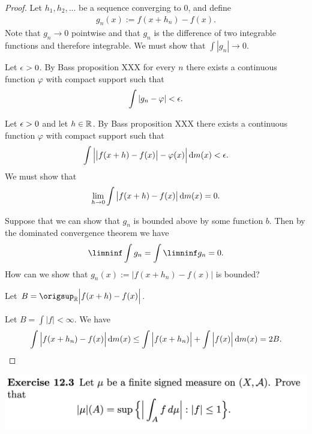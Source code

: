\begin{proof}
  Let $h_1, h_2, ...$ be a sequence converging to $0$, and define
  \begin{align*}
    g_n(x) := f(x + h_n) - f(x).
  \end{align*}
  Note that $g_n \to 0$ pointwise and that $g_n$ is the difference of two integrable functions and therefore
  integrable. We must show that $\int |g_n| \to 0$.

  Let $\epsilon > 0$. By Bass proposition XXX for every $n$ there exists a continuous function $\varphi$ with
  compact support such that
  \begin{align*}
    \int |g_n - \varphi| < \epsilon.
  \end{align*}



  Let $\epsilon > 0$ and let $h \in \mathbb{R}$. By Bass proposition XXX there exists a continuous
  function $\varphi$ with compact support such that
  \begin{align*}
    \int \Big|\big|f(x + h) - f(x)\big| - \varphi(x)\Big| \d m(x) < \eps.
  \end{align*}
  We must show that
  \begin{align*}
    \lim_{h\to 0}\int \big|f(x + h) - f(x)\big| \d m(x) = 0.
  \end{align*}





  Suppose that we can show that $g_n$ is bounded above by some function $b$. Then by the dominated
  convergence theorem we have
  \begin{align*}
    \limninf \int g_n
    = \int \limninf g_n
    = 0.
  \end{align*}
  How can we show that $g_n(x) := \Big|f(x + h_n) - f(x)\Big|$ is bounded?

  Let $B = \origsup_\R \Big|f(x + h) - f(x)\Big|$.

  Let $B = \int |f| < \infty$. We have
  \begin{align*}
    \int \Big|f(x + h_n) - f(x)\Big| \d m(x)
    \leq \int \Big|f(x + h_n)\Big| + \int \Big|f(x)\Big| \d m(x)
    = 2B.
  \end{align*}

\end{proof}

\newpage
\begin{mdframed}
\includegraphics[width=400pt]{img/analysis--berkeley-202a-hw10-551e.png}
\end{mdframed}


